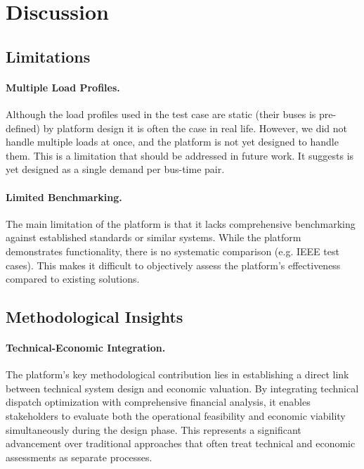 \newpage
\section{Discussion}
\label{sec:discussion}

\subsection{Limitations}
\label{sec:limitations }

\paragraph{Multiple Load Profiles.}
Although the load profiles used in the test case are static (their buses is pre-defined) by platform design it 
is often the case in real life. However, we did not handle multiple loads at once, and the platform is not yet 
designed to handle them. This is a limitation that should be addressed in future work. It suggests is yet designed 
as a single demand per bus-time pair.

\paragraph{Limited Benchmarking.}
The main limitation of the platform is that it lacks comprehensive benchmarking against established 
standards or similar systems. While the platform demonstrates functionality, there is no systematic comparison 
(e.g. IEEE test cases). This makes it difficult to objectively assess the platform's effectiveness compared 
to existing solutions.


\subsection{Methodological Insights}
\label{sec:methodological_insights}

\paragraph{Technical-Economic Integration.}
The platform's key methodological contribution lies in establishing a direct link between technical system design
and economic valuation. By integrating technical dispatch optimization with comprehensive financial analysis, it
enables stakeholders to evaluate both the operational feasibility and economic viability simultaneously during
the design phase. This represents a significant advancement over traditional approaches that often treat technical
and economic assessments as separate processes.

